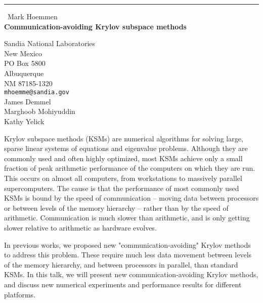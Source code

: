 \documentclass{report}
\begin{document}
\begin{center}
\rule{6in}{1pt} \
{\large Mark Hoemmen \\
{\bf Communication-avoiding Krylov subspace methods}}

Sandia National Laboratories \\ New Mexico \\ PO Box 5800 \\ Albuquerque \\ NM 87185-1320
\\
{\tt mhoemme@sandia.gov}\\
James Demmel\\
Marghoob Mohiyuddin\\
Kathy Yelick\end{center}

Krylov subspace methods (KSMs) are numerical algorithms for
solving large, sparse linear systems of equations and
eigenvalue problems. Although they are commonly used and
often highly optimized, most KSMs achieve only a small
fraction of peak arithmetic performance of the computers on
which they are run. This occurs on almost all computers,
from workstations to massively parallel supercomputers. The
cause is that the performance of most commonly used KSMs is
bound by the speed of communication -- moving data between
processors or between levels of the memory hierarchy --
rather than by the speed of arithmetic. Communication is
much slower than arithmetic, and is only getting slower
relative to arithmetic as hardware evolves.

In previous works, we proposed new "communication-avoiding"
Krylov methods to address this problem. These require much
less data movement between levels of the memory hierarchy,
and between processors in parallel, than standard KSMs. In
this talk, we will present new communication-avoiding Krylov
methods, and discuss new numerical experiments and
performance results for different platforms.
\end{document}
